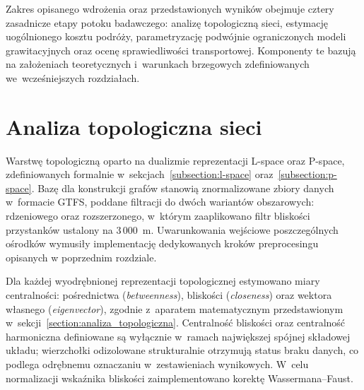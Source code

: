 \documentclass{pracamgr}
\begin{document}
Zakres opisanego wdrożenia oraz przedstawionych wyników obejmuje cztery zasadnicze etapy potoku badawczego: analizę topologiczną sieci, estymację uogólnionego kosztu podróży, parametryzację podwójnie ograniczonych modeli grawitacyjnych oraz ocenę sprawiedliwości transportowej. Komponenty te bazują na założeniach teoretycznych i~warunkach brzegowych zdefiniowanych we~wcześniejszych rozdziałach.




\section{Analiza topologiczna sieci}\label{section:wyniki_topologia}

Warstwę topologiczną oparto na dualizmie reprezentacji L-space oraz P-space, zdefiniowanych formalnie w~sekcjach~\ref{subsection:l-space} oraz~\ref{subsection:p-space}. Bazę dla konstrukcji grafów stanowią znormalizowane zbiory danych w~formacie GTFS, poddane filtracji do dwóch wariantów obszarowych: rdzeniowego oraz rozszerzonego, w~którym zaaplikowano filtr bliskości przystanków ustalony na 3\,000~m. Uwarunkowania wejściowe poszczególnych ośrodków wymusiły implementację dedykowanych kroków preprocesingu opisanych w poprzednim rozdziale. 

Dla każdej wyodrębnionej reprezentacji topologicznej estymowano miary centralności: pośrednictwa (\textit{betweenness}), bliskości (\textit{closeness}) oraz wektora własnego (\textit{eigenvector}), zgodnie z~aparatem matematycznym przedstawionym w~sekcji~\ref{section:analiza_topologiczna}. Centralność bliskości oraz centralność harmoniczna definiowane są wyłącznie w~ramach największej spójnej składowej układu; wierzchołki odizolowane strukturalnie otrzymują status braku danych, co podlega odrębnemu oznaczaniu w~zestawieniach wynikowych. W~celu normalizacji wskaźnika bliskości zaimplementowano korektę Wassermana--Faust.
\end{document}
